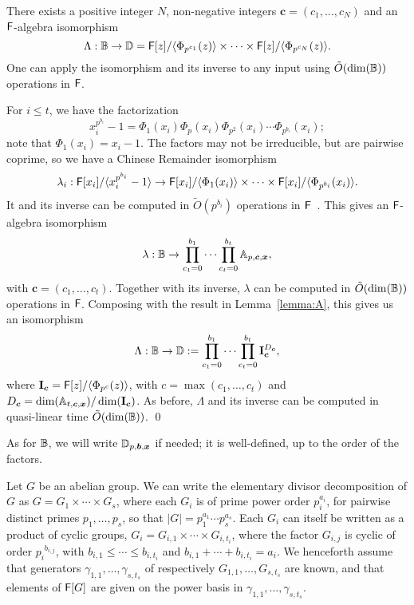 \begin{lemma}\label{lemma:alg}
  There exists a positive integer $N$, non-negative integers
  $\boldsymbol{c}=(c_1,\dots,c_N)$ and  an
  ${\mathsf{F}}$-algebra isomorphism 
  $$\Lambda: \mathbb{B} \to \mathbb{D}= {\mathsf{F}}[z]/\langle \Phi_{p^{c_1}}(z) \rangle \times \cdots \times {\mathsf{F}}[z]/\langle \Phi_{p^{c_N}}(z)\rangle.$$
  One can apply the isomorphism and its inverse to any 
  input using $\tilde{O}(\dim(\mathbb{B}))$ operations in ${\mathsf{F}}$.
\end{lemma}
For $i \le t$, we have the factorization
$$x_i^{p^{b_i}}-1 = \Phi_1(x_i) \Phi_p(x_i) \Phi_{p^2}(x_i) \cdots
\Phi_{p^{b_i}}(x_i);$$ note that $\Phi_1(x_i)=x_i-1$.  The factors may
not be irreducible, but are pairwise coprime, so we have a
Chinese Remainder isomorphism
\[
  \lambda_i: {\mathsf{F}}[x_i]/\langle x_i^{p^{b_i}}-1 \rangle \to {\mathsf{F}}[x_i]/\langle \Phi_1(x_i)\rangle
  \times \cdots \times  {\mathsf{F}}[x_i]/\langle \Phi_{p^{b_i}}(x_i)\rangle.
\]
It and its inverse can be computed  
in $\tilde{O}(p^{b_i})$ operations in ${\mathsf{F}}$~\cite[Chapter~10]{vzGathen13}. 
This gives an ${\mathsf{F}}$-algebra isomorphism
$$\lambda: \mathbb{B} \to \prod_{c_1=0}^{b_1} \cdots \prod_{c_t=0}^{b_t} \mathbb{A}_{p,\boldsymbol{c},\boldsymbol{x}},$$
with $\boldsymbol{c}=(c_1,\dots,c_t)$. Together with its inverse, 
$\lambda$ can be computed in $\tilde{O}(\dim(\mathbb{B}))$ operations in ${\mathsf{F}}$.
Composing with the result in Lemma~\ref{lemma:A}, this gives
us an isomorphism
$$\Lambda: \mathbb{B} \to \mathbb{D}:=\prod_{c_1=0}^{b_1} \cdots \prod_{c_t=0}^{b_t}
\mathbf{I}_{\boldsymbol{c}}^{D_{\boldsymbol{c}}},$$ where
$\mathbf{I}_{\boldsymbol{c}} = {\mathsf{F}}[z]/\langle \Phi_{p^c}(z)\rangle$,
with $c =\max(c_1,\dots,c_t)$ and $D_{\boldsymbol{c}} =
\dim(\mathbb{A}_{t,\boldsymbol{c},\boldsymbol{x}})/\dim(\mathbf{I}_{\boldsymbol{c}})$. As
before, $\Lambda$ and its inverse can be computed in quasi-linear time
$\tilde{O}(\dim(\mathbb{B}))$. \qed

As for $\mathbb{B}$, we will write $\mathbb{D}_{p,\boldsymbol{b},\boldsymbol{x}}$ if needed; it is
well-defined, up to the order of the factors.

\smallskip

 Let $G$ be an abelian group.  We can
write the elementary divisor decomposition of $G$ as $G = G_1 \times
\cdots \times G_s$, where each $G_i$ is of prime power order
$p_i^{a_i}$, for pairwise distinct primes $p_1,\dots,p_s$, so that
$|G| = p_1^{a_1} \cdots p_s^{a_s}$. Each $G_i$ can itself be written
as a product of cyclic groups, $G_i = G_{i,1} \times \cdots \times
G_{i,t_i}$, where the factor $G_{i,j}$ is cyclic of order
${p_i}^{b_{i,j}}$, with $b_{i,1} \le \cdots \le b_{i,t_i}$ and $b_{i,1} + \cdots +
b_{i,t_i} = a_i$. We henceforth assume that generators
$\gamma_{1,1},\dots,\gamma_{s,t_s}$ of respectively
$G_{1,1},\dots,G_{s,t_s}$ are known, and that elements of ${\mathsf{F}}[G]$ are
given on the power basis in $\gamma_{1,1},\dots,\gamma_{s,t_s}$. 

